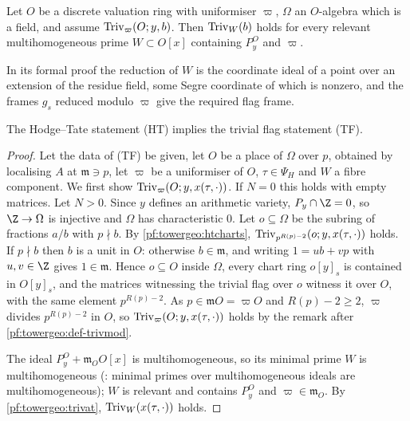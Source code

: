 \begin{lemma}\label{pf:towergeo:trivat}
Let $O$ be a discrete valuation ring with uniformiser $\varpi$, $\Omega$ an $O$-algebra which is a field,
and assume $\mathrm{Triv}_\varpi(O;y,b)$. Then $\mathrm{Triv}_W(b)$ holds for every relevant multihomogeneous
prime $W\subset O[x]$ containing $P^O_y$ and $\varpi$.
\end{lemma}

In its formal proof the reduction of $W$ is the coordinate ideal of a point over an extension of the
residue field, some Segre coordinate of which is nonzero, and the frames $g_s$ reduced modulo $\varpi$ give
the required flag frame.

\begin{theorem}\label{pf:towergeo:triv}
The Hodge--Tate statement \textup{(HT)} implies the trivial flag statement \textup{(TF)}.
\end{theorem}

\begin{proof}
Let the data of (TF) be given, let $O$ be a place of $\Omega$ over $p$, obtained by localising $A$ at
$\mathfrak m\ni p$, let $\varpi$ be a uniformiser of $O$, $\tau\in\Psi_H$ and $W$ a fibre component. We first
show $\mathrm{Triv}_\varpi(O;y,x(\tau,\cdot))$. If $N=0$ this holds with empty matrices. Let $N>0$. Since $y$
defines an arithmetic variety, $P_y\cap\Z=0$, so $\Z\to\Omega$ is injective and $\Omega$ has characteristic
$0$. Let $o\subseteq\Omega$ be the subring of fractions $a/b$ with $p\nmid b$. By
\cref{pf:towergeo:htcharts}, $\mathrm{Triv}_{p^{R(p)-2}}(o;y,x(\tau,\cdot))$ holds. If $p\nmid b$ then $b$
is a unit in $O$: otherwise $b\in\mathfrak m$, and writing $1=ub+vp$ with $u,v\in\Z$ gives
$1\in\mathfrak m$. Hence $o\subseteq O$ inside $\Omega$, every chart ring $o[y]_s$ is contained in $O[y]_s$,
and the matrices witnessing the trivial flag over $o$ witness it over $O$, with the same element
$p^{R(p)-2}$. As $p\in\mathfrak mO=\varpi O$ and $R(p)-2\ge2$, $\varpi$ divides $p^{R(p)-2}$ in $O$, so
$\mathrm{Triv}_\varpi(O;y,x(\tau,\cdot))$ holds by the remark after \cref{pf:towergeo:def-trivmod}.

The ideal $P^O_y+\mathfrak m_OO[x]$ is multihomogeneous, so its minimal prime $W$ is multihomogeneous
(: minimal primes over
multihomogeneous ideals are multihomogeneous); $W$ is relevant and contains $P^O_y$ and
$\varpi\in\mathfrak m_O$. By \cref{pf:towergeo:trivat}, $\mathrm{Triv}_W(x(\tau,\cdot))$ holds.
\end{proof}

